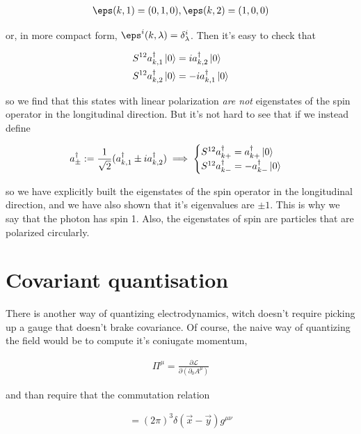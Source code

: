\documentclass{report}
\begin{document}
\begin{align}
    \eps(k, 1) = (0, 1, 0), \eps(k,2) = (1, 0, 0)
\end{align}

or, in more compact form, \(\eps^i(k, \lambda) = \delta^i_\lambda\). Then it's easy to check that 

\begin{align}
    &S^{12}a^\dagger_{k, 1}\ket{0} = ia^\dagger_{k,2}\ket{0} \\
    &S^{12}a^\dagger_{k,2}\ket{0} = -ia^\dagger_{k,1}\ket{0}
\end{align}

so we find that this states with linear polarization \emph{are not} eigenstates of the spin operator in the longitudinal direction. But it's not hard to see that if we instead define 

\begin{align}
    a_{\pm}^\dagger := \frac{1}{\sqrt{2}}(a^\dagger_{k, 1} \pm i a^\dagger_{k,2}) \implies \begin{cases}
        S^{12}a_{k+}^\dagger = a^\dagger_{k+}\ket{0} \\
        S^{12}a_{k-}^\dagger = -a^\dagger_{k-}\ket{0}
    \end{cases}
\end{align}

so we have explicitly built the eigenstates of the spin operator in the longitudinal direction, and we have also shown that it's eigenvalues are \(\pm1\). This is why we say that the photon has spin 1. Also, the eigenstates of spin are particles that are polarized circularly. 

\section{Covariant quantisation}

There is another way of quantizing electrodynamics, witch doesn't require picking up a gauge that doesn't brake covariance. Of course, the naive way of quantizing the field would be to compute it's coniugate momentum, 

\begin{align}
    \Pi^\mu = \frac{\partial\mathcal{L}}{\partial(\partial_0 A^\mu)}
\end{align}

and than require that the commutation relation 

\begin{align}
    [A^\mu(t, \vec{x}), \Pi^\nu(t, \vec{y})] = (2\pi)^3\delta(\vec{x}-\vec{y})g^{\mu\nu}
\end{align}
\end{document}
